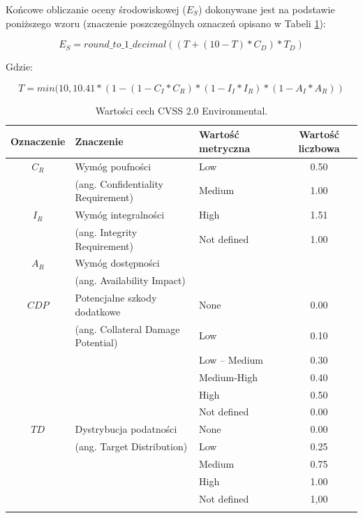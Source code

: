 \bigbreak
Końcowe obliczanie oceny środowiskowej ($E_S$) dokonywane jest na podstawie poniższego wzoru (znaczenie poszczególnych oznaczeń opisano w Tabeli \ref{tab:chapter1:cvss_2_property_env}):

\begin{equation}
\label{eq:cvss2_es}
E_S=round\_to\_1\_decimal((T+ (10 - T) * C_D) * T_D)
\end{equation}

Gdzie:

\begin{equation}
T=min(10, 10.41 * (1 - (1 - C_I * C_R) * (1 - I_I * I_R) * (1- A_I * A_R))
\end{equation}


\begin{table}[tbh]
\caption{Wartości cech CVSS 2.0 Environmental.}
\label{tab:chapter1:cvss_2_property_env}
\begin{center}
\begin{tabular}{cllc}
\hline \noalign {\smallskip}
\textbf{Oznaczenie} & \textbf{Znaczenie} & \textbf{Wartość metryczna} & \textbf{Wartość liczbowa} \\
\hline \noalign {\smallskip}
$C_R$ & Wymóg poufności                  & Low & 0.50\\
      & (ang. Confidentiality Requirement)    & Medium & 1.00 \\
$I_R$ & Wymóg integralności              & High & 1.51 \\
      & (ang. Integrity Requirement)          & Not defined & 1.00 \\
$A_R$ & Wymóg dostępności & & \\
      & (ang. Availability Impact) & & \\
\hline \noalign {\smallskip}
$CDP$ & Potencjalne szkody dodatkowe    & None	& 0.00 \\
      & (ang. Collateral Damage Potential)   & Low	& 0.10 \\
      &                                 & Low – Medium & 0.30 \\
      &                                 & Medium-High  & 0.40 \\
      &                                 & High	& 0.50 \\
      &                                 & Not defined & 	0.00 \\

\hline \noalign {\smallskip}
$TD$ & Dystrybucja podatności          & None	      & 0.00 \\
      & (ang. Target Distribution)           & Low	      & 0.25 \\
      &                                 & Medium	  & 0.75 \\
      &                                 & High	      & 1.00 \\
      &                                 & Not defined & 1,00 \\
\hline \noalign {\smallskip}

\end{tabular}
\end{center}
\end{table}

